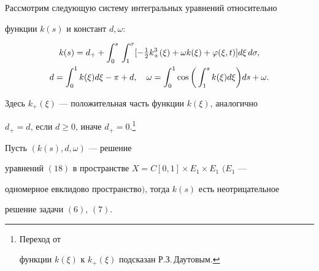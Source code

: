 Рассмотрим следующую систему интегральных уравнений относительно


функции $k(s)$ и констант $d, \omega$:


\begin{gather}


k(s)=d_{+}+ \int_{0}^{s} {} \int_{1}^{\sigma}[{-\tfrac{1}{2}k_{+}^3(\xi)+


\omega k(\xi)+ \varphi (\xi, t)} ] d\xi\, d\sigma,\notag \\


%


d=\int_{0}^{1} k(\xi) d\xi - \pi+d, \quad \omega=\int_0^1 \cos


\bigg(\int_1^s k (\xi )d \xi  \bigg) ds + \omega.


\end{gather}


Здесь $k_{+}(\xi)$ --- положительная часть функции $k(\xi)$, аналогично


$d_{+}=d$, если $d \ge 0$, иначе $d_{+}=0$.\footnote{Переход от


функции $k(\xi)$ к $k_{+}(\xi)$ подсказан Р.З.\,Даутовым.}





\begin{lem}


Пусть $({k(s),d,\omega})$ --- решение


уравнений $(18)$ в пространстве $X=C[0,1] \times E_1 \times E_1$ $(E_1$ ---


одномерное евклидово пространство$)$, тогда $k(s)$ есть неотрицательное


решение задачи $(6)$, $(7)$.


\end{lem}





